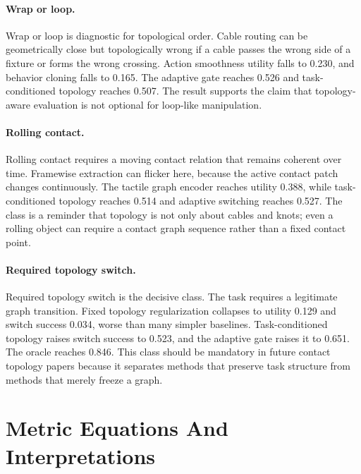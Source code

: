 \documentclass{article}
\begin{document}
\paragraph{Wrap or loop.}
Wrap or loop is diagnostic for topological order. Cable routing can be geometrically close but topologically wrong if a cable passes the wrong side of a fixture or forms the wrong crossing. Action smoothness utility falls to 0.230, and behavior cloning falls to 0.165. The adaptive gate reaches 0.526 and task-conditioned topology reaches 0.507. The result supports the claim that topology-aware evaluation is not optional for loop-like manipulation.

\paragraph{Rolling contact.}
Rolling contact requires a moving contact relation that remains coherent over time. Framewise extraction can flicker here, because the active contact patch changes continuously. The tactile graph encoder reaches utility 0.388, while task-conditioned topology reaches 0.514 and adaptive switching reaches 0.527. The class is a reminder that topology is not only about cables and knots; even a rolling object can require a contact graph sequence rather than a fixed contact point.

\paragraph{Required topology switch.}
Required topology switch is the decisive class. The task requires a legitimate graph transition. Fixed topology regularization collapses to utility 0.129 and switch success 0.034, worse than many simpler baselines. Task-conditioned topology raises switch success to 0.523, and the adaptive gate raises it to 0.651. The oracle reaches 0.846. This class should be mandatory in future contact topology papers because it separates methods that preserve task structure from methods that merely freeze a graph.

\section{Metric Equations And Interpretations}
\end{document}
